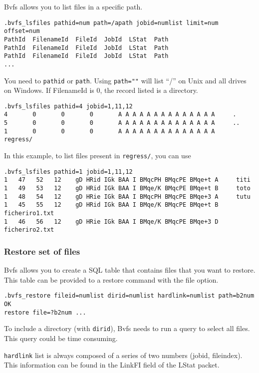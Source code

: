 Bvfs allows you to list files in a specific path.
\begin{verbatim}
.bvfs_lsfiles pathid=num path=/apath jobid=numlist limit=num offset=num
PathId  FilenameId  FileId  JobId  LStat  Path
PathId  FilenameId  FileId  JobId  LStat  Path
PathId  FilenameId  FileId  JobId  LStat  Path
...
\end{verbatim}

You need to \texttt{pathid} or \texttt{path}. Using \texttt{path=""} will list
``/'' on Unix and all drives on Windows. If FilenameId is 0, the record listed
is a directory.

\begin{verbatim}
.bvfs_lsfiles pathid=4 jobid=1,11,12
4       0       0       0       A A A A A A A A A A A A A A     .
5       0       0       0       A A A A A A A A A A A A A A     ..
1       0       0       0       A A A A A A A A A A A A A A     regress/
\end{verbatim}

In this example, to list files present in \texttt{regress/}, you can use
\begin{verbatim}
.bvfs_lsfiles pathid=1 jobid=1,11,12
1   47   52   12    gD HRid IGk BAA I BMqcPH BMqcPE BMqe+t A     titi
1   49   53   12    gD HRid IGk BAA I BMqe/K BMqcPE BMqe+t B     toto
1   48   54   12    gD HRie IGk BAA I BMqcPH BMqcPE BMqe+3 A     tutu
1   45   55   12    gD HRid IGk BAA I BMqe/K BMqcPE BMqe+t B     ficheriro1.txt
1   46   56   12    gD HRie IGk BAA I BMqe/K BMqcPE BMqe+3 D     ficheriro2.txt
\end{verbatim}

\subsubsection*{Restore set of files}

Bvfs allows you to create a SQL table that contains files that you want to
restore. This table can be provided to a restore command with the file option.

\begin{verbatim}
.bvfs_restore fileid=numlist dirid=numlist hardlink=numlist path=b2num
OK
restore file=?b2num ...
\end{verbatim}

To include a directory (with \texttt{dirid}), Bvfs needs to run a query to
select all files. This query could be time consuming.

\texttt{hardlink} list is always composed of a series of two numbers (jobid,
fileindex). This information can be found in the LinkFI field of the LStat
packet.

